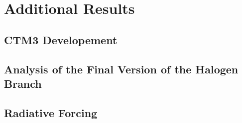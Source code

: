 \chapter{Additional Results}\label{chap:add_res}

\section{CTM3 Developement}\label{app:CTM3_dev}















%


%



%


\clearpage
\section{Analysis of the Final Version of the Halogen Branch}\label{app:final_version}









\clearpage
\section{Radiative Forcing}\label{app:RF}







